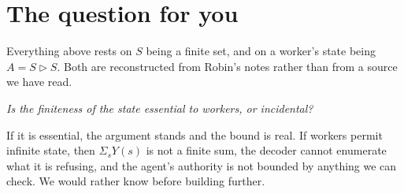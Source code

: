 \documentclass[11pt,a4paper]{article}
\begin{document}
\section{The question for you}

Everything above rests on $S$ being a finite set, and on a worker's state being
$A = S \triangleright S$. Both are reconstructed from Robin's notes rather than
from a source we have read.

\begin{center}
\emph{Is the finiteness of the state essential to workers, or incidental?}
\end{center}

If it is essential, the argument stands and the bound is real. If workers permit
infinite state, then $\Sigma_s Y(s)$ is not a finite sum, the decoder cannot
enumerate what it is refusing, and the agent's authority is not bounded by
anything we can check. We would rather know before building further.
\end{document}
